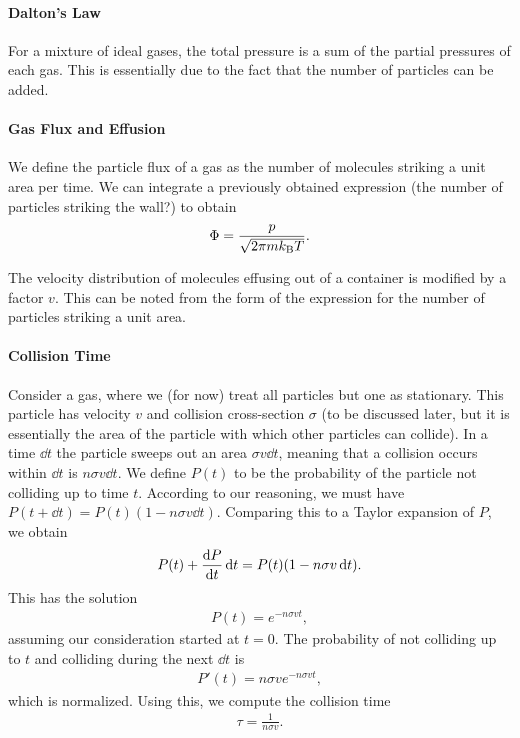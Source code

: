 \paragraph{Dalton's Law}
For a mixture of ideal gases, the total pressure is a sum of the partial pressures of each gas. This is essentially due to the fact that the number of particles can be added.

\paragraph{Gas Flux and Effusion}
We define the particle flux of a gas as the number of molecules striking a unit area per time. We can integrate a previously obtained expression (the number of particles striking the wall?) to obtain
\begin{align*}
	\Phi = \frac{p}{\sqrt{2\pi mk_{\text{B}} T}}.
\end{align*}

The velocity distribution of molecules effusing out of a container is modified by a factor $v$. This can be noted from the form of the expression for the number of particles striking a unit area.

\paragraph{Collision Time}
Consider a gas, where we (for now) treat all particles but one as stationary. This particle has velocity $v$ and collision cross-section $\sigma$ (to be discussed later, but it is essentially the area of the particle with which other particles can collide). In a time $\dd{t}$ the particle sweeps out an area $\sigma v\dd{t}$, meaning that a collision occurs within $\dd{t}$ is $n\sigma v\dd{t}$. We define $P(t)$ to be the probability of the particle not colliding up to time $t$. According to our reasoning, we must have $P(t + \dd{t}) = P(t)(1 - n\sigma v\dd{t})$. Comparing this to a Taylor expansion of $P$, we obtain
\begin{align*}
	P(t) + \dv{P}{t}\dd{t} = P(t)(1 - n\sigma v\dd{t}).
\end{align*}
This has the solution
\begin{align*}
	P(t) = e^{-n\sigma vt},
\end{align*}
assuming our consideration started at $t = 0$. The probability of not colliding up to $t$ and colliding during the next $\dd{t}$ is
\begin{align*}
	P'(t) = n\sigma ve^{-n\sigma vt},
\end{align*}
which is normalized. Using this, we compute the collision time
\begin{align*}
	\tau = \frac{1}{n\sigma v}.
\end{align*}

